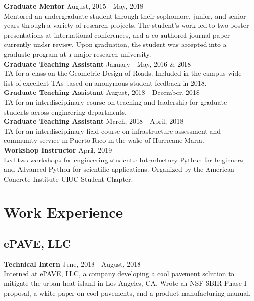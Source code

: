 \documentclass[12pt]{article}
\begin{document}
\textbf{Graduate Mentor} \hfill August, 2015 - May, 2018 \\
Mentored an undergraduate student through their sophomore, junior, and senior years through a variety of research projects. The student's work led to two poster presentations at international conferences, and a co-authored journal paper currently under review. Upon graduation, the student was accepted into a graduate program at a major research university. \\

\textbf{Graduate Teaching Assistant} \hfill January - May, 2016 \& 2018 \\
TA for a class on the Geometric Design of Roads. Included in the campus-wide list of excellent TAs based on anonymous student feedback in 2018. \\

\textbf{Graduate Teaching Assistant} \hfill August, 2018 - December, 2018 \\
TA for an interdisciplinary course on teaching and leadership for graduate students across engineering departments. \\

\textbf{Graduate Teaching Assistant} \hfill March, 2018 - April, 2018 \\
TA for an interdisciplinary field course on infrastructure assessment and community service in Puerto Rico in the wake of Hurricane Maria. \\

\textbf{Workshop Instructor} \hfill April, 2019\\
Led two workshops for engineering students: Introductory Python for beginners, and Advanced Python for scientific applications. Organized by the American Concrete Institute UIUC Student Chapter. \\

\section*{Work Experience}
\subsection*{ePAVE, LLC}
\textbf{Technical Intern} \hfill June, 2018 - August, 2018 \\
Interned at ePAVE, LLC, a company developing a cool pavement solution to mitigate the urban heat island in Los Angeles, CA. Wrote an NSF SBIR Phase I proposal, a white paper on cool pavements, and a product manufacturing manual. \\
\end{document}
